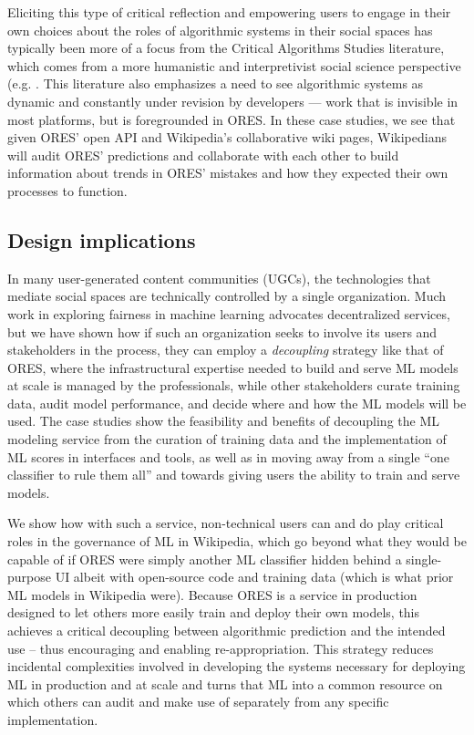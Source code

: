 Eliciting this type of critical reflection and empowering users to engage in their own choices about the roles of algorithmic systems in their social spaces has typically been more of a focus from the Critical Algorithms Studies literature, which comes from a more humanistic and interpretivist social science perspective (e.g. \cite{barocas2013governing, kitchin2017thinking}. This literature also emphasizes a need to see algorithmic systems as dynamic and constantly under revision by developers \cite{seaver2017algorithms} --- work that is invisible in most platforms, but is foregrounded in ORES. In these case studies, we see that given ORES' open API and Wikipedia's collaborative wiki pages, Wikipedians will audit ORES' predictions and collaborate with each other to build information about trends in ORES' mistakes and how they expected their own processes to function.

\subsection{Design implications}
In many user-generated content communities (UGCs), the technologies that mediate social spaces are technically controlled by a single organization. Much work in exploring fairness in machine learning advocates decentralized services, but we have shown how if such an organization seeks to involve its users and stakeholders in the process, they can employ a \emph{decoupling} strategy like that of ORES, where the infrastructural expertise needed to build and serve ML models at scale is managed by the professionals, while other stakeholders curate training data, audit model performance, and decide where and how the ML models will be used. The case studies show the feasibility and benefits of decoupling the ML modeling service from the curation of training data and the implementation of ML scores in interfaces and tools, as well as in moving away from a single ``one classifier to rule them all'' and towards giving users the ability to train and serve models. 

We show how with such a service, non-technical users can and do play critical roles in the governance of ML in Wikipedia, which go beyond what they would be capable of if ORES were simply another ML classifier hidden behind a single-purpose UI albeit with open-source code and training data (which is what prior ML models in Wikipedia were). Because ORES is a service in production designed to let others more easily train and deploy their own models, this achieves a critical decoupling between algorithmic prediction and the intended use -- thus encouraging and enabling re-appropriation.  This strategy reduces incidental complexities involved in developing the systems necessary for deploying ML in production and at scale and turns that ML into a common resource on which others can audit and make use of separately from any specific implementation.

